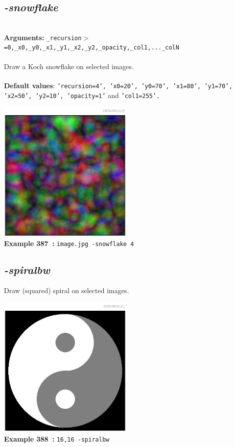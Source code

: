 \documentclass[a4paper,11pt,twoside]{book}
\begin{document}
\subsection{\emph{-snowflake} }\vspace*{-0.5em}
~\\\textbf{Arguments: } 
{\small \texttt{\_recursion$>$=0,\_x0,\_y0,\_x1,\_y1,\_x2,\_y2,\_opacity,\_col1,...\_colN}}\\~\\
Draw a Koch snowflake on selected images.
~\\~\\\textbf{Default values}: {\small \texttt{'recursion=4', 'x0=20', 'y0=70', 'x1=80', 'y1=70', 'x2=50', 'y2=10', 'opacity=1'} and \texttt{'col1=255'.}}
\begin{center}\includegraphics[keepaspectratio=true,height=7cm,width=\textwidth]{img/gmic_def387.jpg}\\
{\footnotesize \textbf{Example 387~:} \texttt{image.jpg -snowflake 4}}
\end{center}

\subsection{\emph{-spiralbw} }\vspace*{-0.5em}
Draw (squared) spiral on selected images.
\begin{center}\includegraphics[keepaspectratio=true,height=7cm,width=\textwidth]{img/gmic_def388.jpg}\\
{\footnotesize \textbf{Example 388~:} \texttt{16,16 -spiralbw}}
\end{center}
\end{document}

